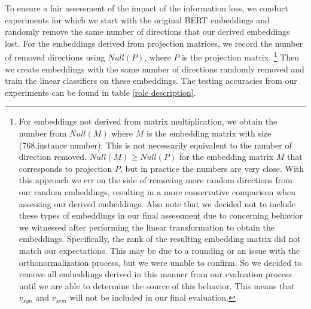 \documentclass[11pt,a4paper]{article}
\begin{document}
To ensure a fair assessment of the impact of the information loss, we conduct experiments for which we start with the original BERT embeddings and randomly remove the same number of directions that our derived embeddings lost. For the embeddings derived from projection matrices, we record the number of removed directions using $Null(P)$, where $P$ is the projection matrix. \footnote{For embeddings not derived from matrix multiplication, we obtain the number from $Null(M)$ where $M$ is the embedding matrix with size (768,instance number). This is not necessarily equivalent to the number of direction removed. $Null(M) \geq Null(P)$ for the embedding matrix $M$ that corresponds to projection $P$, but in practice the numbers are very close. With this approach we err on the side of removing more random directions from our random embeddings, resulting in a more conservative comparison when assessing our derived embeddings. Also note that we decided not to include these types of embeddings in our final assessment due to concerning behavior we witnessed after performing the linear transformation to obtain the embeddings. Specifically, the rank of the resulting embedding matrix did not match our expectations. This may be due to a rounding or an issue with the orthonormalization process, but we were unable to confirm. So we decided to remove all embeddings derived in this manner from our evaluation process until we are able to determine the source of this behavior. This means that $v_{syn}$ and $v_{sem}$ will not be included in our final evaluation.} Then we create embeddings with the same number of directions randomly removed and train the linear classifiers on these embeddings. The testing accuracies from our experiments can be found in table \ref{role description}.
\end{document}
